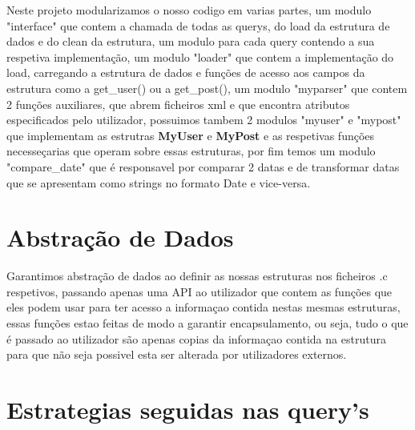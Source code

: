 \documentclass[a4paper,10pt]{article}
\begin{document}
    \quad Neste projeto modularizamos o nosso codigo em varias partes, um modulo "interface" que contem a chamada de todas as querys, do load da estrutura de dados e do clean da estrutura, um modulo para cada query contendo a sua respetiva implementa\c{c}\~{a}o, um modulo "loader" que contem a implementa\c{c}\~{a}o do load, carregando a estrutura de dados e fun\c{c}\~{o}es de acesso aos campos da estrutura como a get\_user() ou a get\_post(), um modulo "myparser" que contem 2 fun\c{c}\~{o}es auxiliares, que abrem ficheiros xml e que encontra atributos especificados pelo utilizador, possuimos tambem 2 modulos "myuser" e "mypost" que implementam as estrutras \textbf{MyUser} e \textbf{MyPost} e as respetivas fun\c{c}\~{o}es necesse\c{c}arias que operam sobre essas estruturas, por fim temos um modulo "compare\_date" que \'e responsavel por comparar 2 datas e de transformar datas que se apresentam como strings no formato Date e vice-versa.


    \section {Abstra\c{c}\~{a}o de Dados}

    \quad Garantimos abstra\c{c}\~{a}o de dados ao definir as nossas estruturas nos ficheiros .c respetivos, passando apenas uma API ao utilizador que contem as fun\c{c}\~{o}es que eles podem usar para ter acesso a informa\c{c}ao contida nestas mesmas estruturas, essas fun\c{c}\~{o}es estao feitas de modo a garantir encapsulamento, ou seja, tudo o que é passado ao utilizador s\~ao apenas copias da informa\c{c}ao contida na estrutura para que n\~ao seja possivel esta ser alterada por utilizadores externos.
  

  \section {Estrategias seguidas nas query's}
    
\end{document}
